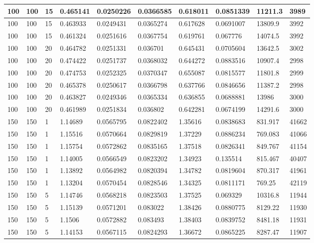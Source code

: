 \begin{landscape}
\begin{longtable}{ | l | l | l | l | l | l | l | l | l | l | }
100 & 100 & 15 & 0.465141 & 0.0250226 & 0.0366585 & 0.618011 & 0.0851339 & 11211.3 & 3989\\ \hline
100 & 100 & 15 & 0.463933 & 0.0249431 & 0.0365274 & 0.617628 & 0.0691007 & 13809.9 & 3992\\ \hline
100 & 100 & 15 & 0.461324 & 0.0251616 & 0.0367754 & 0.619761 & 0.067776 & 14074.5 & 3992\\ \hline
100 & 100 & 20 & 0.464782 & 0.0251331 & 0.036701 & 0.645431 & 0.0705604 & 13642.5 & 3002\\ \hline
100 & 100 & 20 & 0.474422 & 0.0251737 & 0.0368032 & 0.644272 & 0.0883516 & 10907.4 & 2998\\ \hline
100 & 100 & 20 & 0.474753 & 0.0252325 & 0.0370347 & 0.655087 & 0.0815577 & 11801.8 & 2999\\ \hline
100 & 100 & 20 & 0.465378 & 0.0250617 & 0.0366798 & 0.637766 & 0.0846656 & 11387.2 & 2998\\ \hline
100 & 100 & 20 & 0.463827 & 0.0249346 & 0.0365334 & 0.636855 & 0.0688881 & 13986 & 3000\\ \hline
100 & 100 & 20 & 0.461989 & 0.0251834 & 0.036802 & 0.642281 & 0.0674199 & 14291.6 & 3000\\ \hline
150 & 150 & 1 & 1.14689 & 0.0565795 & 0.0822402 & 1.35616 & 0.0838683 & 831.917 & 41662\\ \hline
150 & 150 & 1 & 1.15516 & 0.0570664 & 0.0829819 & 1.37229 & 0.0886234 & 769.083 & 41066\\ \hline
150 & 150 & 1 & 1.15754 & 0.0572862 & 0.0835165 & 1.37518 & 0.0826341 & 849.767 & 41154\\ \hline
150 & 150 & 1 & 1.14005 & 0.0566549 & 0.0823202 & 1.34923 & 0.135514 & 815.467 & 40407\\ \hline
150 & 150 & 1 & 1.13892 & 0.0564982 & 0.0820394 & 1.34782 & 0.0819604 & 870.317 & 41961\\ \hline
150 & 150 & 1 & 1.13204 & 0.0570454 & 0.0828546 & 1.34325 & 0.0811171 & 769.25 & 42119\\ \hline
150 & 150 & 5 & 1.14746 & 0.0568218 & 0.0823503 & 1.37525 & 0.069329 & 10316.8 & 11944\\ \hline
150 & 150 & 5 & 1.15139 & 0.0571201 & 0.083022 & 1.38426 & 0.0880775 & 8129.22 & 11930\\ \hline
150 & 150 & 5 & 1.1506 & 0.0572882 & 0.083493 & 1.38403 & 0.0839752 & 8481.18 & 11931\\ \hline
150 & 150 & 5 & 1.14153 & 0.0567115 & 0.0824293 & 1.36672 & 0.0865225 & 8287.47 & 11907\\ \hline

\end{longtable}
\end{landscape}
